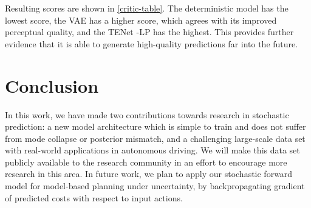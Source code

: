 \documentclass{article}
\newcommand{\modelname}{TENet }
\begin{document}
Resulting scores are shown in \cref{critic-table}.
The deterministic model has the lowest score, the VAE has a higher score, which agrees with its improved perceptual quality, and the \modelname-LP has the highest.
This provides further evidence that it is able to generate high-quality predictions far into the future.

\section{Conclusion}

In this work, we have made two contributions towards research in stochastic prediction: a new model architecture which is simple to train and does not suffer from mode collapse or posterior mismatch, and a challenging large-scale data set with real-world applications in autonomous driving.
We will make this data set publicly available to the research community in an effort to encourage more research in this area.
In future work, we plan to apply our stochastic forward model for model-based planning under uncertainty, by backpropagating gradient of predicted costs with respect to input actions.

%
%
%
%
%
%
\end{document}
